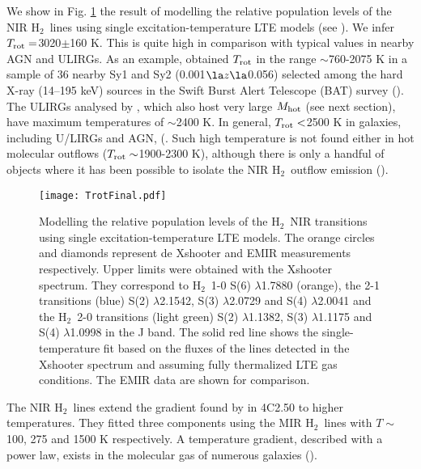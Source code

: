 \documentclass{aa}
\newcommand{\hmol}{H$_2$~}
\begin{document}
We show in Fig. \ref{figtemp} the result of modelling the relative population levels of the NIR   \hmol lines using  single excitation-temperature LTE models (see \citealt{Pereira2014}).  
We infer $T_{\rm rot}=$3020$\pm$160 K. This is quite high in comparison with typical values in nearby AGN and ULIRGs. As an example, \cite{Riffel2021} obtained  $T_{\rm rot}$ in the range $\sim$760-2075 K in a sample of  36 nearby Sy1 and Sy2 (0.001$\la z \la$0.056) selected  among the hard X-ray (14–195 keV) sources in the Swift
Burst Alert Telescope (BAT) survey (\citealt{Oh2018}). The ULIRGs analysed by \cite{Davies2003}, which also host very large  $M_{\rm hot}$ (see next section), have  maximum temperatures of $\sim$2400 K. 
 In general, $T_{\rm rot}<$2500 K in galaxies, including U/LIRGs and AGN, (\cite{Murphy2001,Davies2003,Ardila2004,Ardila2005,Ramos2009,Mazzalay2013,Pereira2014}.  Such high temperature is not found either in hot molecular outflows ($T_{\rm rot}\sim$1900-2300  K), although there is only a handful of   objects where it has been possible to isolate the  NIR \hmol outflow emission (\citealt{Emonts2014,Tadhunter2014,Ramos2019}). 

\begin{figure}
\centering
\texttt{[image: TrotFinal.pdf]}
\caption{Modelling the relative population levels of the \hmol NIR transitions using single excitation-temperature LTE models. The orange circles and diamonds represent de Xshooter and EMIR measurements respectively. Upper limits were obtained with the Xshooter spectrum. They correspond to  \hmol 1-0 S(6) $\lambda$1.7880  (orange), the 2-1 transitions (blue) S(2)  $\lambda$2.1542, S(3) $\lambda$2.0729 and S(4) $\lambda$2.0041  and the \hmol 2-0 transitions (light green) S(2)  $\lambda$1.1382, S(3)  $\lambda$1.1175 and S(4)  $\lambda$1.0998 in the J band. The solid red line shows the single-temperature fit based on the  fluxes of the lines detected in the Xshooter spectrum and assuming fully thermalized LTE gas conditions. The EMIR data are shown for comparison.}
\label{figtemp}
\end{figure}


The NIR \hmol lines extend the  gradient found by \cite{Guillard2012} in 4C2.50 to higher temperatures. They fitted three  components using  the MIR \hmol lines  with  $T\sim$100, 275 and 1500 K respectively.   A temperature   gradient, described with a power law, exists in the molecular gas of numerous galaxies (\citealt{Davies2003,Ogle2010,Guillard2012,Pereira2014,Togi2016}).       
\end{document}
